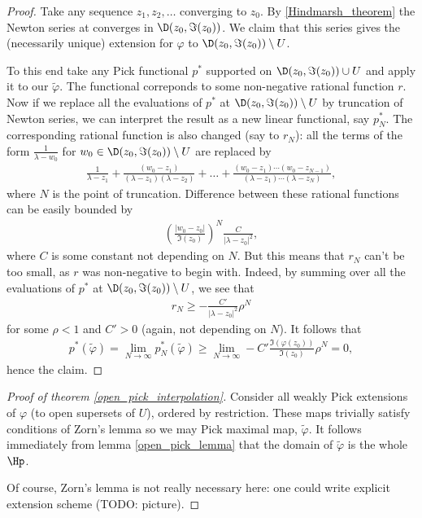 \begin{proof}
	Take any sequence $z_{1}, z_{2}, \ldots$ converging to $z_{0}$. By \ref{Hindmarsh_theorem} the Newton series at converges in $\D(z_{0}, \Im(z_{0}))$. We claim that this series gives the (necessarily unique) extension for $\varphi$ to $\D(z_{0}, \Im(z_{0})) \setminus U$.

	To this end take any Pick functional $p^{*}$ supported on  $\D(z_{0}, \Im(z_{0})) \cup U$ and apply it to our $\tilde{\varphi}$. The functional correponds to some non-negative rational function $r$. Now if we replace all the evaluations of $p^{*}$ at $\D(z_{0}, \Im(z_{0})) \setminus U$ by truncation of Newton series, we can interpret the result as a new linear functional, say $p^{*}_{N}$. The corresponding rational function is also changed (say to $r_{N}$): all the terms of the form $\frac{1}{\lambda - w_{0}}$ for $w_{0} \in \D(z_{0}, \Im(z_{0})) \setminus U$ are replaced by
	\begin{align*}
		\frac{1}{\lambda - z_{1}} + \frac{(w_{0} - z_{1})}{(\lambda - z_{1}) (\lambda - z_{2})} + \ldots + \frac{(w_{0} - z_{1})\cdots (w_{0} - z_{N - 1})}{(\lambda - z_{1})\cdots (\lambda - z_{N})},
	\end{align*}
	where $N$ is the point of truncation. Difference between these rational functions can be easily bounded by
	\begin{align*}
		\left(\frac{|w_{0} - z_{0}|}{\Im(z_{0})}\right)^{N}\frac{C}{|\lambda - z_{0}|^2},
	\end{align*}
	where $C$ is some constant not depending on $N$. But this means that $r_{N}$ can't be too small, as $r$ was non-negative to begin with. Indeed, by summing over all the evaluations of $p^{*}$ at $\D(z_{0}, \Im(z_{0})) \setminus U$, we see that
	\begin{align*}
		r_{N} \geq -\frac{C'}{|\lambda - z_{0}|^2} \rho^{N}
	\end{align*}
	for some $\rho < 1$ and $C' > 0$ (again, not depending on $N$). It follows that
	\begin{align*}
		p^{*}(\tilde{\varphi}) = \lim_{N \to \infty} p^{*}_{N}(\tilde{\varphi}) \geq \lim_{N \to \infty} -C' \frac{\Im(\varphi(z_{0}))}{\Im(z_{0})} \rho^{N} = 0,
	\end{align*}
	hence the claim.
\end{proof}


\begin{proof}[Proof of theorem \ref{open_pick_interpolation}]
	Consider all weakly Pick extensions of $\varphi$ (to open supersets of $U$), ordered by restriction. These maps trivially satisfy conditions of Zorn's lemma so we may Pick maximal map, $\tilde{\varphi}$. It follows immediately from lemma \ref{open_pick_lemma} that the domain of $\tilde{\varphi}$ is the whole $\Hp$.

	Of course, Zorn's lemma is not really necessary here: one could write explicit extension scheme (TODO: picture).
\end{proof}

